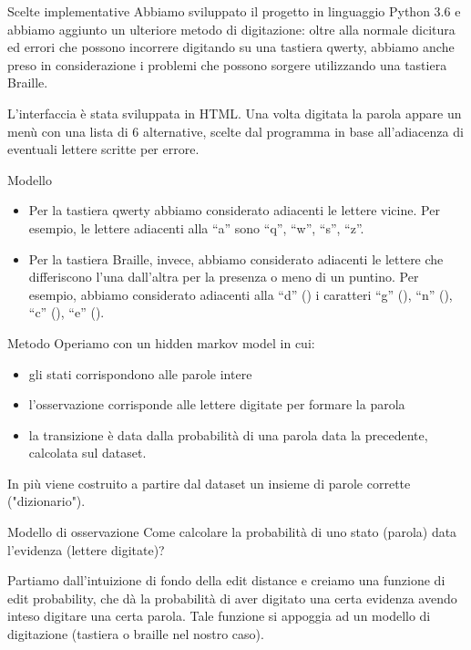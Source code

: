 \documentclass[aspectratio=169]{beamer}
\begin{document}
\begin{frame}{Scelte implementative}
Abbiamo sviluppato il progetto in linguaggio Python 3.6 e abbiamo aggiunto un ulteriore metodo di digitazione: oltre alla normale dicitura ed errori 
che possono incorrere digitando su una tastiera qwerty, abbiamo anche preso in considerazione i problemi che possono sorgere utilizzando una tastiera 
Braille.

L’interfaccia è stata sviluppata in HTML. Una volta digitata la parola appare un menù con una lista di 6 alternative, scelte dal programma in base 
all’adiacenza di eventuali lettere scritte per errore.
\end{frame}
\begin{frame}{Modello}
\begin{itemize}
 \item Per la tastiera qwerty abbiamo considerato adiacenti le lettere vicine. Per esempio, le lettere adiacenti alla “a” sono “q”, “w”, “s”, “z”.
 \item Per la tastiera Braille, invece, abbiamo considerato adiacenti le lettere che differiscono l’una dall’altra per la presenza o meno di un 
puntino. Per esempio, abbiamo considerato adiacenti alla “d” () i caratteri “g” (), “n” (),  “c” (), “e” 
().
\end{itemize}
\end{frame}

\begin{frame}{Metodo}
 Operiamo con un hidden markov model in cui:
 \begin{itemize}
  \item gli stati corrispondono alle parole intere
  \item l'osservazione corrisponde alle lettere digitate per formare la parola
  \item la transizione è data dalla probabilità di una parola data la precedente, calcolata sul dataset.
 \end{itemize}
 In più viene costruito a partire dal dataset un insieme di parole corrette ("dizionario").
\end{frame}

\begin{frame}{Modello di osservazione}
 Come calcolare la probabilità di uno stato (parola) data l'evidenza (lettere digitate)?
 
 Partiamo dall'intuizione di fondo della edit distance e creiamo una funzione di edit probability, che dà la probabilità di aver digitato una certa 
evidenza avendo inteso digitare una certa parola. Tale funzione si appoggia ad un modello di digitazione (tastiera o braille nel nostro caso).
 
 \end{frame}
 
\end{document}
